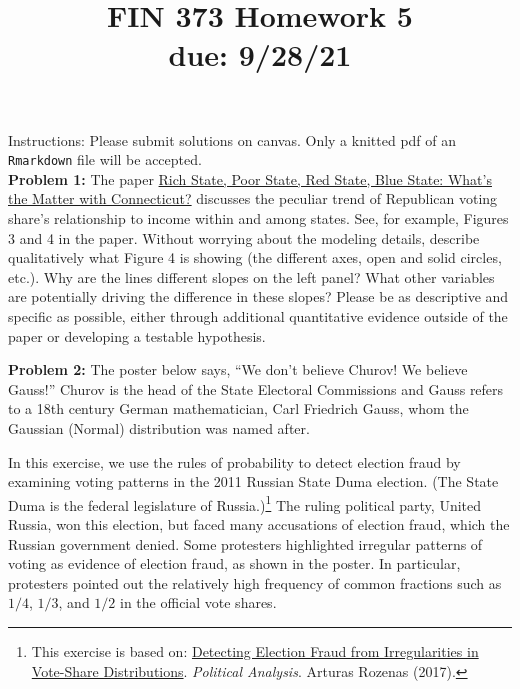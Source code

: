\documentclass[11pt]{article}
\begin{document}
\title{FIN 373 Homework 5 \\ {\large due: \textbf{9/28/21}}}
\date{}
\maketitle

\vspace{-20mm}

\noindent Instructions: Please submit solutions on canvas.  Only a knitted pdf of an {\tt Rmarkdown} file will be accepted.
\\

\noindent \textbf{Problem 1:} The paper \href{http://www.stat.columbia.edu/~gelman/research/published/rb_qjps.pdf}{Rich State, Poor State, Red State, Blue State: What's the Matter with Connecticut?} discusses the peculiar trend of Republican voting share's relationship to income within and among states.  See, for example, Figures 3 and 4 in the paper.  Without worrying about the modeling details, describe qualitatively what Figure 4 is showing (the different axes, open and solid circles, etc.).  Why are the lines different slopes on the left panel?  What other variables are potentially driving the difference in these slopes?  Please be as descriptive and specific as possible, either through additional quantitative evidence outside of the paper or developing a testable hypothesis. 

\vspace{7mm}
\noindent \textbf{Problem 2:} The poster below says, ``We don't believe Churov! We believe Gauss!''  Churov is the head of the State Electoral Commissions and Gauss refers to a 18th century German mathematician, Carl Friedrich Gauss, whom the Gaussian (Normal) distribution was named after. 

In this exercise, we use the rules of probability to detect election fraud by examining voting patterns in the 2011 Russian State Duma election. (The State Duma is the federal legislature of Russia.)\footnote{This exercise is based on: \href{https://www.cambridge.org/core/journals/political-analysis/article/detecting-election-fraud-from-irregularities-in-voteshare-distributions/1C48196DDCECC891F913CE0CEE948F3E}{Detecting Election Fraud from Irregularities in Vote-Share Distributions}. \textit{Political Analysis}. Arturas Rozenas (2017). } The ruling political party, United Russia, won this election, but faced many accusations of election fraud, which the Russian government denied.  Some protesters highlighted irregular patterns of voting as evidence of election fraud, as shown in the poster. In particular, protesters pointed out the relatively high frequency of common fractions such as $1/4$, $1/3$, and $1/2$ in the official vote shares.
\end{document}
